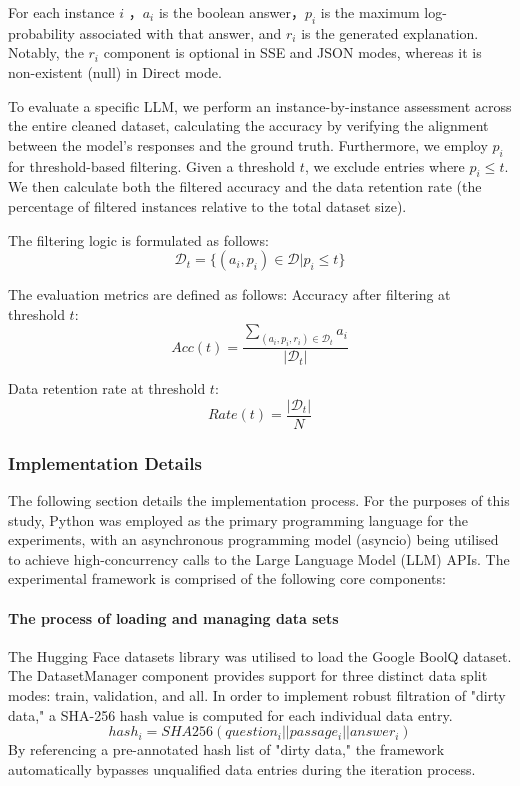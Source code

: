 For each instance $i$ ，$a_i$ is the boolean answer，$p_i$ is the maximum log-probability associated with that answer, and $r_i$ is the generated explanation.
Notably, the $r_i$ component is optional in SSE and JSON modes, whereas it is non-existent (null) in Direct mode.

To evaluate a specific LLM, we perform an instance-by-instance assessment across the entire cleaned dataset, calculating the accuracy by verifying the alignment between the model's responses and the ground truth. Furthermore, we employ $p_i$ for threshold-based filtering. Given a threshold $t$, we exclude entries where $p_i \leq t$. We then calculate both the filtered accuracy and the data retention rate (the percentage of filtered instances relative to the total dataset size).

The filtering logic is formulated as follows:
$$
\mathcal{D}_t = \{(a_i,p_i) \in \mathcal{D} | p_i \leq t\}
$$

The evaluation metrics are defined as follows:
Accuracy after filtering at threshold $t$:
$$
Acc(t) = \frac{\sum_{(a_i, p_i, r_i) \in \mathcal{D}_t} a_i}{|\mathcal{D}_t|}
$$

Data retention rate at threshold $t$:
$$
Rate(t) = \frac{|\mathcal{D}_t|}{N}
$$

\subsubsection{Implementation Details}

The following section details the implementation process.
For the purposes of this study, Python was employed as the primary programming language for the experiments, with an asynchronous programming model (asyncio) being utilised to achieve high-concurrency calls to the Large Language Model (LLM) APIs. The experimental framework is comprised of the following core components:

\paragraph{The process of loading and managing data sets}

The Hugging Face datasets library was utilised to load the Google BoolQ dataset. The DatasetManager component provides support for three distinct data split modes: train, validation, and all. In order to implement robust filtration of "dirty data," a SHA-256 hash value is computed for each individual data entry.
$$
hash_i = SHA256(question_i || passage_i || answer_i)
$$
By referencing a pre-annotated hash list of "dirty data," the framework automatically bypasses unqualified data entries during the iteration process.

